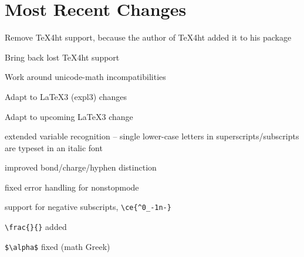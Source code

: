 \documentclass[a4paper,notitlepage,parskip=half]{scrreprt}
\begin{document}
\section{Most Recent Changes}%

\begin{compactitem}
\item Remove TeX4ht support, because the author of TeX4ht added it to his package
\end{compactitem}

\begin{compactitem}
\item Bring back lost TeX4ht support
\end{compactitem}

\begin{compactitem}
\item Work around unicode-math incompatibilities
\end{compactitem}

\begin{compactitem}
\item Adapt to \LaTeX3 (expl3) changes
\end{compactitem}

\begin{compactitem}
\item Adapt to upcoming \LaTeX3 change
\end{compactitem}

\begin{compactitem}
\item extended variable recognition -- single lower-case letters in superscripts/subscripts are typeset in an italic font
\item improved bond/charge/hyphen distinction 
\item fixed error handling for nonstopmode
\end{compactitem}

\begin{compactitem}
\item support for negative subscripts, \verb|\ce{^0_-1n-}|
\item \verb|\frac{}{}| added
\item \verb|$\alpha$| fixed (math Greek)
\end{compactitem}
\end{document}
